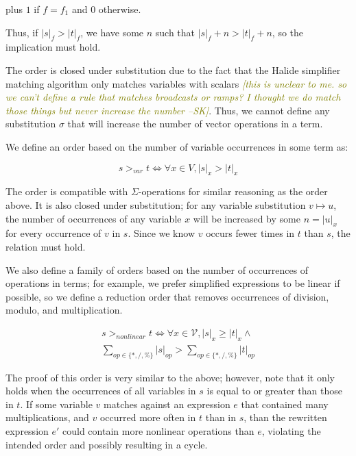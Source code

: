 \documentclass[sigplan,10pt,review,anonymous]{acmart}\settopmatter{printfolios=true,printccs=false,printacmref=false}
\newcommand{\sak}[1]{\textcolor{olive}{\textit{[{#1} --SK]}}}
\begin{document}
plus $1$ if $f = f_1$ and $0$ otherwise.

Thus, if $|s|_f > |t|_f$, we have some $n$ such that $|s|_f + n > |t|_f + n$, so the implication must hold.

The order is closed under substitution due to the fact that the Halide
simplifier matching algorithm only matches variables with scalars \sak{this is unclear to me.  so we can't
  define a rule that matches broadcasts or ramps?  I thought we do match those things but never increase
the number}. Thus, we
cannot define any substitution $\sigma$ that will increase the number of vector
operations in a term.

We define an order based on the number of variable occurrences in some term as:

\begin{equation}
s >_{var} t \iff \forall x \in V, |s|_x > |t|_x
\end{equation}

The order is compatible with $\Sigma$-operations for similar reasoning as the
order above. It is also closed under substitution; for any variable substitution
$v \mapsto u$, the number of occurrences of any variable $x$ will be increased
by some $n = |u|_x$ for every occurrence of $v$ in $s$. Since we know $v$ occurs
fewer times in $t$ than $s$, the relation must hold.

We also define a family of orders based on the number of occurrences of operations in
terms; for example, we prefer simplified expressions to be linear if possible,
so we define a reduction order that removes occurrences of division, modulo, and
multiplication.

\begin{equation}
\begin{split}
s >_{nonlinear} t \iff \forall x \in \mathcal{V}, |s|_x \geq |t|_x \wedge \\
\sum_{op \in \{*,/,\%\}} |s|_{op} > \sum_{op \in \{*,/,\%\}} |t|_{op}
\end{split}
\end{equation}

The proof of this order is very similar to the above; however, note that it only
holds when the occurrences of all variables in $s$ is equal to or greater than
those in $t$. If some variable $v$ matches against an expression $e$ that
contained many multiplications, and $v$ occurred more often in $t$ than in $s$,
than the rewritten expression $e'$ could contain more nonlinear operations than
$e$, violating the intended order and possibly resulting in a cycle.
\end{document}
